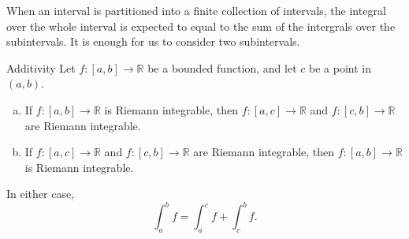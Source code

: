 When an interval is partitioned into a finite collection of intervals,
the integral over the whole interval is expected to equal to the sum of the intergrals over the subintervals. It is enough for us to consider two subintervals.
\begin{theorem}{Additivity}
Let $f:[a,b]\to\mathbb{R}$ be a bounded function, and let $c$ be a point in $(a,b)$.
\begin{enumerate}[(a)]
\item
If $f:[a,b]\to\mathbb{R}$ is Riemann integrable, then  $f:[a,c]\to\mathbb{R}$  and $f:[c,b]\to\mathbb{R}$  are Riemann integrable.
\item If $f:[a,c]\to\mathbb{R}$  and $f:[c,b]\to\mathbb{R}$  are Riemann integrable, then $f:[a,b]\to\mathbb{R}$ is Riemann integrable. 
\end{enumerate}In either case,
\[\int_a^b f=\int_a^c f+\int_c^b f.\]
\end{theorem}

